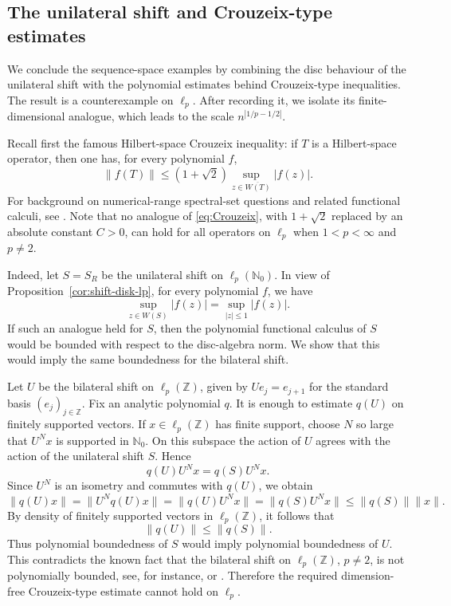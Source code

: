 \documentclass[11pt]{amsart}
\numberwithin{equation}{section}
\theoremstyle{definition}
\theoremstyle{remark}
\begin{document}
\subsection{The unilateral shift and Crouzeix-type estimates}

We conclude the sequence-space examples by combining the disc behaviour of the unilateral shift with the polynomial estimates behind Crouzeix-type inequalities.  The result is a counterexample on \(\ell_p\).  After recording it, we isolate its finite-dimensional analogue, which leads to the scale
\(
 n^{|1/p-1/2|}.
\)

Recall first the famous Hilbert-space Crouzeix inequality: if $T$ is a Hilbert-space operator, then one has, for every polynomial $f$,
\begin{equation}\label{eq:Crouzeix}
\|f(T)\|\le (1+\sqrt 2)\sup_{z\in \overline{W(T)}} |f(z)|.
\end{equation}
For background on numerical-range spectral-set questions and related functional calculi, see \cite{CrouzeixJFA,CrouzeixPalencia,BBsurvey,GW,CG2019}.  Note that no analogue of \eqref{eq:Crouzeix}, with $1+\sqrt 2$ replaced by an absolute constant $C> 0$, can hold for all operators on $\ell_p$ when $1<p<\infty$ and $p\neq2$.

Indeed, let $S=S_R$ be the unilateral shift on $\ell_p(\mathbb N_0)$.  In view of  Proposition~\ref{cor:shift-disk-lp},
 for every polynomial $f$, we have
\[
\sup_{z\in W(S)}|f(z)|=\sup_{|z|\le1}|f(z)|.
\]
If such an analogue held for \(S\), then the polynomial functional calculus of
\(S\) would be bounded with respect to the disc-algebra norm. We show that this
would imply the same boundedness for the bilateral shift.

Let \(U\) be the bilateral shift on \(\ell_p(\mathbb Z)\), given by \(Ue_j=e_{j+1}\) for the standard basis \((e_j)_{j\in\mathbb Z}\).  Fix an analytic polynomial
\(q\). It is enough to estimate \(q(U)\) on finitely supported vectors. If
\(x\in\ell_p(\mathbb Z)\) has finite support, choose \(N\) so large that \(U^Nx\)
is supported in \(\mathbb N_0\). On this subspace the action of \(U\) agrees with
the action of the unilateral shift \(S\). Hence
\[
q(U)U^Nx=q(S)U^Nx .
\]
Since \(U^N\) is an isometry and commutes with \(q(U)\), we obtain
\[
\|q(U)x\|
=
\|U^Nq(U)x\|
=
\|q(U)U^Nx\|
=
\|q(S)U^Nx\|
\le \|q(S)\| \|x\|.
\]
By density of finitely supported vectors in \(\ell_p(\mathbb Z)\), it follows that
\[
\|q(U)\|\le \|q(S)\|.
\]
Thus polynomial boundedness of \(S\) would imply polynomial boundedness of
\(U\). This contradicts the known fact that the bilateral shift on
\(\ell_p(\mathbb Z)\), \(p\ne2\), is not polynomially bounded, see, for instance,
\cite[Theorem~5.7]{Fixman1959} or \cite[Proposition~4.1]{Cohen2018}.
Therefore the required dimension-free Crouzeix-type estimate cannot hold on
\(\ell_p\).
\end{document}
